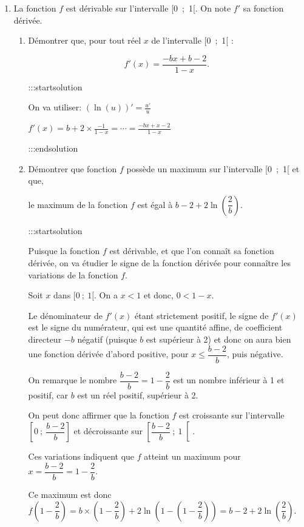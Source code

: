 \documentclass{cornouaille}
\begin{document}
\begin{enumerate}
\item La fonction $f$ est dérivable sur l'intervalle [0~;~1[. On note $f'$ sa fonction dérivée.

\begin{enumerate}
\item Démontrer que, pour tout réel
$x$ de l'intervalle [0~;~1[ :


$$
f'(x) = \dfrac{- bx + b - 2}{1 - x}.
$$



:::startsolution

On va utiliser: $\left(\ln (u) \right) ' = \frac{u'}{u}$

$f'(x) = b + 2\times \frac{-1}{1-x} = \cdots = \frac{-bx+x-2}{1-x}$


:::endsolution
\item Démontrer que fonction $f$ possède un maximum sur l'intervalle [0~;~1[ et que,

le maximum de la fonction $f$ est égal à $b - 2 + 2\ln \left(\dfrac{2}{b}\right)$.


:::startsolution

Puisque la fonction $f$ est dérivable, et que l'on connaît sa fonction dérivée, on va étudier le signe de la fonction dérivée pour connaître les variations de la fonction $f$.

\smallskip

Soit $x$ dans $[0~;~1[$. On a $x < 1$ et donc, $0< 1  -x$.

Le dénominateur de $f'(x)$ étant strictement positif, le signe de $f'(x)$ est le signe du numérateur, qui est une quantité affine, de coefficient directeur $- b$ négatif (puisque $b$ est supérieur à 2) et donc on aura bien une fonction dérivée d'abord positive, pour $x \leqslant \dfrac{b - 2}{b}$, puis négative.

On remarque le nombre $\dfrac{b-2}{b} = 1 - \dfrac{2}{b}$ est un nombre inférieur à 1 et positif, car $b$ est un réel positif, supérieur à 2.

On peut donc affirmer que la fonction $f$ est croissante sur l'intervalle $\left[0~;~\dfrac{b - 2}{b}\right] $ et décroissante sur $\left[\dfrac{b - 2}{b}~;~1\right[$.

Ces variations indiquent que $f$ atteint un maximum pour $x = \dfrac{b - 2}{b} = 1 - \dfrac{2}{b}$.

Ce maximum est donc $f\left(1 - \dfrac{2}{b}\right) = b\times \left(1 - \dfrac{2}{b}\right) + 2\ln\left(1 - \left(1 - \dfrac{2}{b} \right) \right) = b - 2 + 2 \ln\left(\dfrac{2}{b}\right) $.


\end{enumerate}
\end{enumerate}
\end{document}
